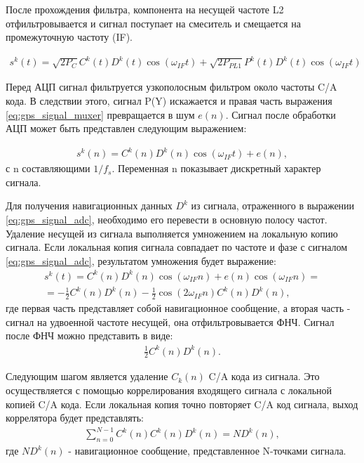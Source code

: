 После прохождения фильтра, компонента на несущей частоте L2 отфильтровывается и сигнал поступает на смеситель и смещается на
промежуточную частоту (IF).

\begin{eqnarray}
s^k(t) =	\sqrt{2P_C} C^k(t) D^k(t) \cos(\omega_{IF} t) +
		\sqrt{2P_{PL1}} P^k(t) D^k(t) \cos(\omega_{IF} t)
\label{eq:gps_signal_muxer}
\end{eqnarray}

Перед АЦП сигнал фильтруется узкополосным фильтром около частоты C/A кода. В следствии этого, сигнал P(Y) искажается и правая часть
выражения \ref{eq:gps_signal_muxer} превращается в шум ${e(n)}$. Сигнал после обработки АЦП может быть представлен следующим
выражением:

\begin{eqnarray}
s^k(n) =	C^k(n) D^k(n) \cos(\omega_{IF} t) + e(n),
\label{eq:gps_signal_adc}
\end{eqnarray}
с n составляющими ${1/f_s}$. Переменная n показывает дискретный характер сигнала.

Для получения навигационных данных ${D^k}$ из сигнала, отраженного в выражении \ref{eq:gps_signal_adc}, необходимо его 
перевести в основную полосу частот. Удаление несущей из сигнала выполняется умножением на локальную копию сигнала.
Если локальная копия сигнала совпадает по частоте и фазе с сигналом \ref{eq:gps_signal_adc}, результатом умножения 
будет выражение:
\begin{eqnarray}
s^k(t)	=	C^k(n) D^k(n) \cos(\omega_{IF} n) + e(n) \cos(\omega_{IF} n) = \nonumber \\
	=	-\frac{1}{2}C^k(n) D^k(n) - \frac{1}{2}\cos(2\omega_{IF} n)C^k(n) D^k(n),
\label{eq:gps_signal_lpf}
\end{eqnarray}
где первая часть представляет собой навигационное сообщение, а вторая часть - сигнал на удвоенной частоте несущей, она
отфильтровывается ФНЧ. Сигнал после ФНЧ можно представить в виде:
\begin{eqnarray}
\frac{1}{2}C^k(n) D^k(n).
\label{eq:gps_signal_ca}
\end{eqnarray}

Следующим шагом является удаление ${C_k(n)}$ C/A кода из сигнала. Это осуществляется с помощью коррелирования 
входящего сигнала с локальной копией C/A кода. Если локальная копия точно повторяет C/A код сигнала, 
выход коррелятора будет представлять:
\begin{eqnarray}
\sum_{n=0}^{N-1} C^k(n) C^k(n) D^k(n) = ND^k(n),
\label{eq:gps_signal_ca}
\end{eqnarray}
где ${ND^k(n)}$ - навигационное сообщение, представленное N-точками сигнала.

